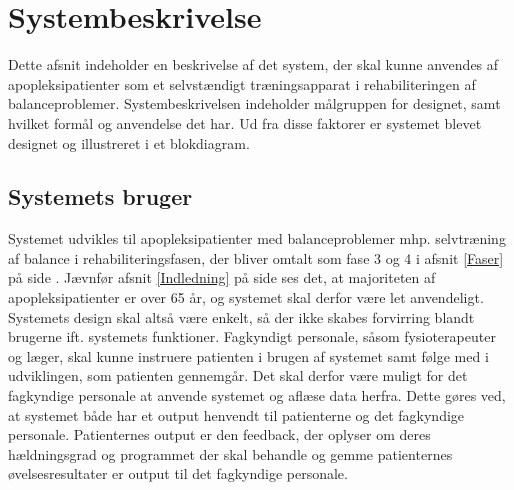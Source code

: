 \section{Systembeskrivelse} 
Dette afsnit indeholder en beskrivelse af det system, der skal kunne anvendes af apopleksipatienter som et selvstændigt træningsapparat i rehabiliteringen af balanceproblemer. Systembeskrivelsen indeholder målgruppen for designet, samt hvilket formål og anvendelse det har. Ud fra disse faktorer er systemet blevet designet og illustreret i et blokdiagram. 

\subsection{Systemets bruger}
Systemet udvikles til apopleksipatienter med balanceproblemer mhp. selvtræning af balance i rehabiliteringsfasen, der bliver omtalt som fase 3 og 4 i afsnit \ref{Faser} på side \pageref{Faser}. Jævnfør afsnit \ref{Indledning} på side \pageref{Indledning} ses det, at majoriteten af apopleksipatienter er over 65 år, og systemet skal derfor være let anvendeligt. Systemets design skal altså være enkelt, så der ikke skabes forvirring blandt brugerne ift. systemets funktioner. Fagkyndigt personale, såsom fysioterapeuter og læger, skal kunne instruere patienten i brugen af systemet samt følge med i udviklingen, som patienten gennemgår. Det skal derfor være muligt for det fagkyndige personale at anvende systemet og aflæse data herfra. Dette gøres ved, at systemet både har et output henvendt til patienterne og det fagkyndige personale. Patienternes output er den feedback, der oplyser om deres hældningsgrad og programmet der skal behandle og gemme patienternes øvelsesresultater er output til det fagkyndige personale. 

